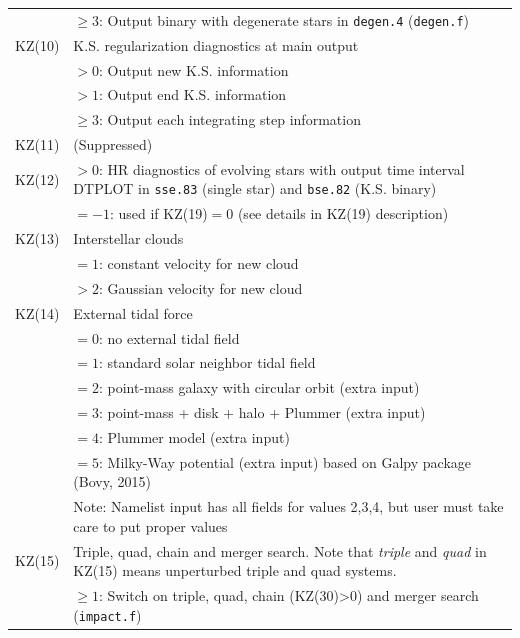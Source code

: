 \begin{longtable}{@{}p{1.5cm}p{13.0cm}}
        & $\ge 3$: Output binary with degenerate stars in \texttt{degen.4} (\texttt{degen.f}) \\
KZ(10)  & K.S. regularization diagnostics at main output \\
        & $>0$: Output new K.S. information \\
        & $>1$: Output end K.S. information \\
        & $\ge 3$: Output each integrating step information\\
KZ(11)  & (Suppressed) \\
KZ(12)  & $>0$: HR diagnostics of evolving stars with output time interval DTPLOT in \texttt{sse.83} (single star) and \texttt{bse.82} (K.S. binary) \\
        & $=-1$: used if KZ(19)$=0$ (see details in KZ(19) description)\\
KZ(13)  & Interstellar clouds \\
        & $=1$: constant velocity for new cloud\\
        & $>2$: Gaussian velocity for new cloud\\
KZ(14)  & External tidal force \\
        & $=0$: no external tidal field\\
        & $=1$: standard solar neighbor tidal field\\
        & $=2$: point-mass galaxy with circular orbit (extra input) \\
        & $=3$: point-mass + disk + halo + Plummer (extra input) \\
        & $=4$: Plummer model (extra input) \\
        & $=5$: Milky-Way potential (extra input) based on Galpy package (Bovy, 2015) \\
        & Note: Namelist input has all fields for values 2,3,4, but user must take care to put proper values \\
KZ(15)  & Triple, quad, chain and merger search. Note that \textit{triple} and \textit{quad} in KZ(15) means unperturbed triple and quad systems. \\
        & $\ge 1$: Switch on triple, quad, chain (KZ(30)>0) and merger search (\texttt{impact.f}) \\

\end{longtable}
